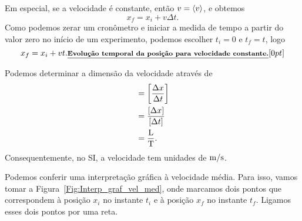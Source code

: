 \noindent{}Em especial, se a velocidade é constante, então $v = \left\langle{v}\right\rangle$, e obtemos
\begin{equation}
    x_f = x_i + v \Delta t.
\end{equation}
%
Como podemos zerar um cronômetro e iniciar a medida de tempo a partir do valor zero no início de um experimento, podemos escolher $t_i = 0$ e $t_f = t$, logo
\begin{equation}\label{Eq:XX0AT}
  x_f = x_i + vt.\relax{\footnotesize\emph{\textbf{Evolução temporal da posição para velocidade constante.}}}[0pt]
\end{equation}


Podemos determinar a dimensão da velocidade através de
\begin{align}
    [\mean{v}] &= \left[\frac{\Delta x}{\Delta t}\right] \\
    &= \frac{[\Delta x]}{[\Delta t]} \\
    &= \frac{\rm{L}}{\rm{T}}.
\end{align}
%
Consequentemente, no SI, a velocidade tem unidades de $\rm{m}/\rm{s}$.

Podemos conferir uma interpretação gráfica à velocidade média. Para isso, vamos tomar a Figura~\ref{Fig:Interp_graf_vel_med}, onde marcamos dois pontos que correspondem à posição $x_i$ no instante $t_i$ e à posição $x_f$ no instante $t_f$. Ligamos esses dois pontos por uma reta.


